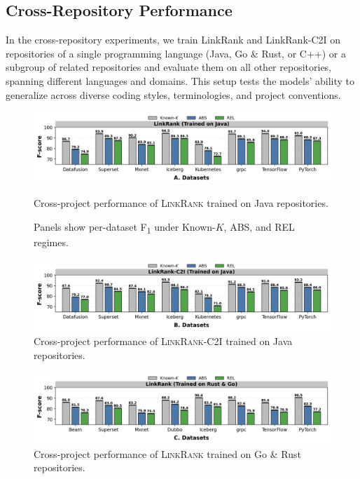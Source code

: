 \subsection{Cross-Repository Performance}

In the cross-repository experiments, we train LinkRank and LinkRank-C2I on repositories of a single programming language (Java, Go \& Rust, or C++) or a subgroup of related repositories and evaluate them on all other repositories, spanning different languages and domains. This setup tests the models' ability to generalize across diverse coding styles, terminologies, and project conventions.

\begin{figure}[H]
  \centering
  \includegraphics[width=\linewidth]{Figures/LR-java.png}
  \caption{Cross-project performance of \textsc{LinkRank} trained on Java repositories. }
  \caption*{Panels show per-dataset F\textsubscript{1} under Known-$K$, ABS, and REL regimes.}
  \label{fig:LR-java}
\end{figure}

\begin{figure}[H]
  \centering
  \includegraphics[width=\linewidth]{Figures/lr-C2I-java.png}
  \caption{Cross-project performance of \textsc{LinkRank-C2I} trained on Java repositories.}
  \label{fig:LR-C2I-java}
\end{figure}


\begin{figure}[H]
  \centering
  \includegraphics[width=\linewidth]{Figures/LR-rust.png}
  \caption{Cross-project performance of \textsc{LinkRank} trained on Go \& Rust repositories.}
  \label{fig:LR-rust}
\end{figure}

